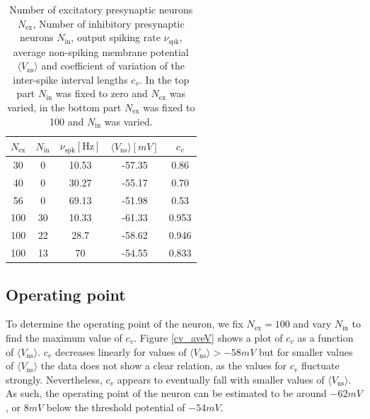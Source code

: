 \documentclass{scrartcl}
\begin{document}
\begin{table}
\centering
\begin{tabular}{c c c c c}
$N_\mathrm{ex}$ & $N_\mathrm{in}$ & $\nu_\mathrm{spk} [\si{\hertz}]$ &$\langle V_\mathrm{ns}\rangle [\si{mV}]$ & $c_v$ \\ \hline \hline
30 & 0 & 10.53 & -57.35 & 0.86\\
40 & 0 & 30.27 & -55.17 & 0.70\\
56 & 0 & 69.13 & -51.98 & 0.53\\ \hline
100 & 30 & 10.33 & -61.33& 0.953\\
100 & 22 & 28.7 & -58.62& 0.946\\
100 & 13 & 70 & -54.55& 0.833\\
\end{tabular}
\caption{Number of excitatory presynaptic neurons $N_\mathrm{ex}$, Number of inhibitory presynaptic neurons $N_\mathrm{in}$, output spiking rate $\nu_\mathrm{spk}$, average non-spiking membrane potential $\langle V_\mathrm{ns}\rangle$ and coefficient of variation of the inter-spike interval lengths $c_v$. In the top part $N_\mathrm{in}$ was fixed to zero and $N_\mathrm{ex}$ was varied, in the bottom part $N_\mathrm{ex}$ was fixed to 100 and $N_\mathrm{in}$ was varied.}
\label{rates}
\end{table}

\subsection*{Operating point}

To determine the operating point of the neuron, we fix $N_\mathrm{ex}=100$ and vary $N_\mathrm{in}$ to find the maximum value of $c_v$. Figure \ref{cv_aveV} shows a plot of $c_v$ as a function of $\langle V_\mathrm{ns}\rangle$. $c_v$ decreases linearly for values of $\langle V_\mathrm{ns}\rangle > -58\si{mV}$ but for smaller values of $\langle V_\mathrm{ns}\rangle$ the data does not show a clear relation, as the values for $c_v$ fluctuate strongly. Nevertheless, $c_v$ appears to eventually fall with smaller values of $\langle V_\mathrm{ns}\rangle$. As such, the operating point of the neuron can be estimated to be around $-62\si{mV}$, or $8\si{mV}$ below the threshold potential of $-54\si{mV}$.
\end{document}
